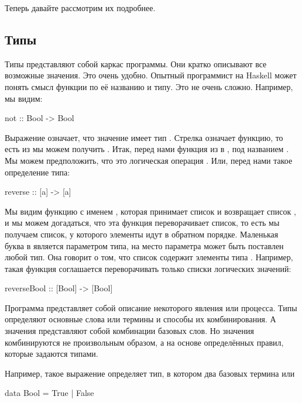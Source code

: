 Теперь давайте рассмотрим их подробнее.


\subsection{Типы}

Типы представляют собой каркас программы. Они кратко
описывают все возможные значения. Это очень удобно.
Опытный программист на Haskell может понять смысл
функции по её названию и типу. Это не очень сложно.
Например, мы видим:

\begin{code}
not :: Bool -> Bool
\end{code}

Выражение  означает, что значение
 имеет тип . Стрелка \mbox{}
означает функцию, то есть из  мы можем получить .
Итак, перед нами функция из  в ,
под названием . Мы можем предположить, что
это логическая операция . 
Или, перед нами такое определение типа:

\begin{code}
reverse :: [a] -> [a]
\end{code}

Мы видим функцию с именем , которая принимает
список \mbox{\In{[a]}} и возвращает список \In{[a]}, и мы
можем догадаться, что эта функция переворачивает список, то есть
мы получаем список, у которого элементы идут в обратном порядке.
Маленькая буква  в \In{[a]} является параметром типа,
на место параметра может быть поставлен любой тип.
Она говорит о том, что список содержит элементы типа .
Например, такая функция соглашается переворачивать только
списки логических значений:

\begin{code}
reverseBool :: [Bool] -> [Bool]
\end{code}

Программа представляет собой описание
некоторого явления или процесса. Типы определяют 
основные слова или термины и способы их комбинирования.
А значения представляют собой комбинации базовых 
слов. Но значения комбинируются не произвольным
образом, а на основе определённых правил, которые 
задаются типами. 

Например, такое выражение определяет тип, в котором
два базовых термина   или 

\begin{code}
data Bool = True | False
\end{code}

